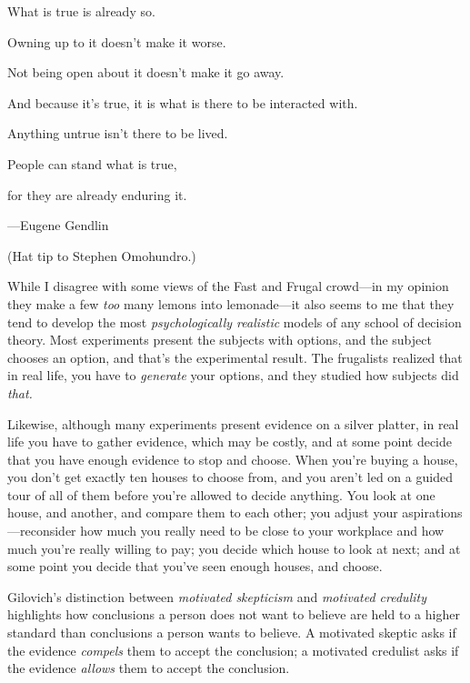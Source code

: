 {
 What is true is already so.}

{
 Owning up to it doesn't make it worse.}

{
 Not being open about it doesn't make it go away.}

{
 And because it's true, it is what is there to be
interacted with.}

{
 Anything untrue isn't there to be lived.}

{
 People can stand what is true,}

{
 for they are already enduring it.}

{\raggedleft
 {}---Eugene Gendlin
\par}


\bigskip

{
 (Hat tip to Stephen Omohundro.)}

\myendsectiontext


\bigskip


{
 While I disagree with some views of the Fast and Frugal crowd---in
my opinion they make a few \textit{too} many lemons into lemonade---it
also seems to me that they tend to develop the most
\textit{psychologically realistic} models of any school of decision
theory. Most experiments present the subjects with options, and the
subject chooses an option, and that's the experimental
result. The frugalists realized that in real life, you have to
\textit{generate} your options, and they studied how subjects did
\textit{that.} }

{
 Likewise, although many experiments present evidence on a silver
platter, in real life you have to gather evidence, which may be costly,
and at some point decide that you have enough evidence to stop and
choose. When you're buying a house, you
don't get exactly ten houses to choose from, and you
aren't led on a guided tour of all of them before
you're allowed to decide anything. You look at one
house, and another, and compare them to each other; you adjust your
aspirations---reconsider how much you really need to be close to your
workplace and how much you're really willing to pay;
you decide which house to look at next; and at some point you decide
that you've seen enough houses, and choose.}

{
 Gilovich's distinction between \textit{motivated
skepticism} and \textit{motivated credulity} highlights how conclusions
a person does not want to believe are held to a higher standard than
conclusions a person wants to believe. A motivated skeptic asks if the
evidence \textit{compels} them to accept the conclusion; a motivated
credulist asks if the evidence \textit{allows} them to accept the
conclusion.}

